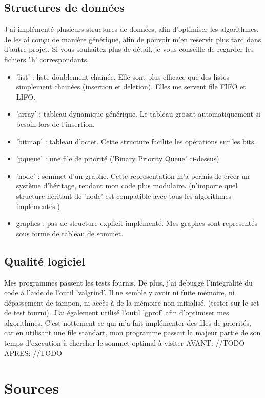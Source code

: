 \documentclass[a4paper,10pt]{article}
\begin{document}
    \subsection{Structures de données}
      J'ai implémenté plusieurs structures de données, afin d'optimiser les algorithmes. Je les ai conçu de manière générique,
      afin de pouvoir m'en reservir plus tard dans d'autre projet. Si vous souhaitez plus de détail, je vous
      conseille de regarder les fichiers '.h' correspondants.
      \begin{itemize}[label=-]
	\item 'list'   : liste doublement chainée. Elle sont plus efficace que des listes simplement chainées (insertion et deletion).
			Elles me servent file FIFO et LIFO.
	\item 'array'  : tableau dynamique générique. Le tableau grossit automatiquement si besoin lors de l'insertion.
	\item 'bitmap' : tableau d'octet. Cette structure facilite les opérations sur les bits.
	\item 'pqueue' : une file de priorité ('Binary Priority Queue' ci-dessus)
	\item 'node'   : sommet d'un graphe. Cette representation m'a permis de créer un système d'héritage,
			rendant mon code plus modulaire. (n'importe quel structure héritant de 'node'
			est compatible avec tous les algorithmes implémentés.)
	\item graphes  : pas de structure explicit implémenté. Mes graphes sont representés sous forme de tableau de sommet.
      \end{itemize}
      
      \subsection{Qualité logiciel}
	Mes programmes passent les tests fournis.\newline\newline
	De plus, j'ai debuggé l'integralité du code à l'aide de l'outil 'valgrind'.
	Il ne semble y avoir ni fuite mémoire, ni dépassement de tampon, ni accès à de la mémoire non initialisé.
	(tester sur le set de test fourni).\newline\newline
	J'ai également utilisé l'outil 'gprof' afin d'optimiser mes algorithmes. C'est nottement ce qui m'a fait implémenter des files de priorités,
	car en utilisant une file standart, mon programme passait la majeur partie de son temps d'execution à chercher le sommet optimal à visiter
	AVANT:
	//TODO
	APRES:
	//TODO

  \newpage
  \section{Sources}

    
\end{document}
